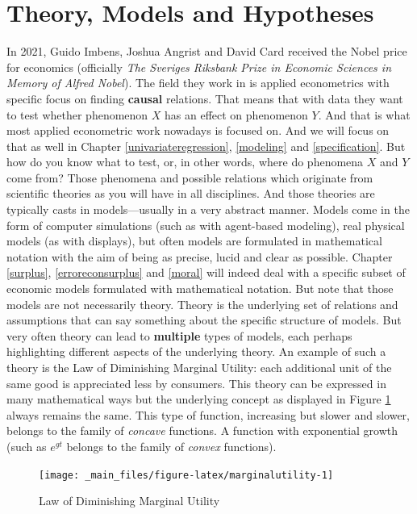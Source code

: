 \documentclass[
]{book}
\begin{document}
\hypertarget{theory-models-and-hypotheses}{%
\section{Theory, Models and Hypotheses}\label{theory-models-and-hypotheses}}

In 2021, Guido Imbens, Joshua Angrist and David Card received the Nobel price for economics (officially \emph{The Sveriges Riksbank Prize in Economic Sciences in Memory of Alfred Nobel}). The field they work in is applied econometrics with specific focus on finding \textbf{causal} relations. That means that with data they want to test whether phenomenon \(X\) has an effect on phenomenon \(Y\). And that is what most applied econometric work nowadays is focused on. And we will focus on that as well in Chapter \ref{univariateregression}, \ref{modeling} and \ref{specification}. But how do you know what to test, or, in other words, where do phenomena \(X\) and \(Y\) come from? Those phenomena and possible relations which originate from scientific theories as you will have in all disciplines. And those theories are typically casts in models---usually in a very abstract manner. Models come in the form of computer simulations (such as with agent-based modeling), real physical models (as with displays), but often models are formulated in mathematical notation with the aim of being as precise, lucid and clear as possible. Chapter \ref{surplus}, \ref{erroreconsurplus} and \ref{moral} will indeed deal with a specific subset of economic models formulated with mathematical notation. But note that those models are not necessarily theory. Theory is the underlying set of relations and assumptions that can say something about the specific structure of models. But very often theory can lead to \textbf{multiple} types of models, each perhaps highlighting different aspects of the underlying theory. An example of such a theory is the Law of Diminishing Marginal Utility: each additional unit of the same good is appreciated less by consumers. This theory can be expressed in many mathematical ways but the underlying concept as displayed in Figure \ref{fig:marginalutility} always remains the same. This type of function, increasing but slower and slower, belongs to the family of \emph{concave} functions. A function with exponential growth (such as \(e^{gt}\) belongs to the family of \emph{convex} functions).

\begin{figure}

{\centering \texttt{[image: \_main\_files/figure-latex/marginalutility-1]} 

}

\caption{Law of Diminishing Marginal Utility}\label{fig:marginalutility}
\end{figure}
\end{document}
